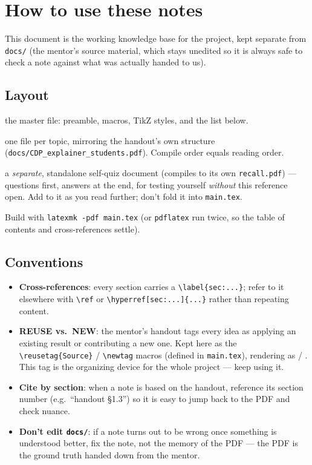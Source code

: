 \section*{How to use these notes}
\label{sec:howto}

This document is the working knowledge base for the project, kept separate
from \texttt{docs/} (the mentor's source material, which stays unedited so
it is always safe to check a note against what was actually handed to us).

\subsection*{Layout}

\begin{description}[leftmargin=2.2em]
  \item[\texttt{main.tex}] the master file: preamble, macros, TikZ styles,
    and the \verb|| list below.
  \item[\texttt{sections/}] one file per topic, mirroring the handout's own
    structure (\texttt{docs/CDP\_explainer\_students.pdf}). Compile order
    equals reading order.
  \item[\texttt{recall.tex}] a \emph{separate}, standalone self-quiz document
    (compiles to its own \texttt{recall.pdf}) --- questions first, answers
    at the end, for testing yourself \emph{without} this reference open.
    Add to it as you read further; don't fold it into \texttt{main.tex}.
\end{description}

Build with \texttt{latexmk -pdf main.tex} (or \texttt{pdflatex} run twice, so
the table of contents and cross-references settle).

\subsection*{Conventions}

\begin{itemize}
  \item \textbf{Cross-references}: every section carries a
    \verb|\label{sec:...}|; refer to it elsewhere with \verb|\ref| or
    \verb|\hyperref[sec:...]{...}| rather than repeating content.
  \item \textbf{REUSE vs.\ NEW}: the mentor's handout tags every idea as
    applying an existing result or contributing a new one. Kept here as the
    \verb|\reusetag{Source}| / \verb|\newtag| macros (defined in
    \texttt{main.tex}), rendering as  / \newtag. This tag is
    the organizing device for the whole project --- keep using it.
  \item \textbf{Cite by section}: when a note is based on the handout,
    reference its section number (e.g.\ ``handout \S1.3'') so it is easy to
    jump back to the PDF and check nuance.
  \item \textbf{Don't edit \texttt{docs/}}: if a note turns out to be wrong
    once something is understood better, fix the note, not the memory of the
    PDF --- the PDF is the ground truth handed down from the mentor.
\end{itemize}

